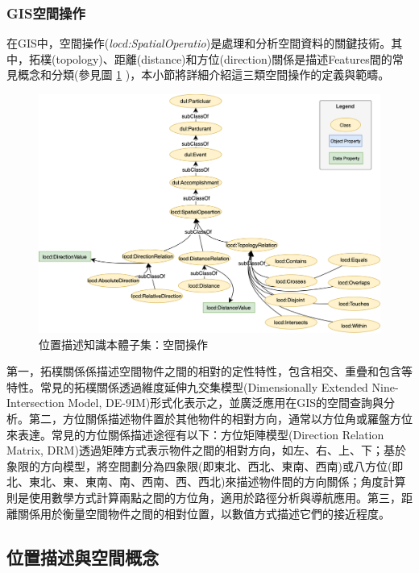 

\subsubsection{GIS空間操作}

在GIS中，空間操作(\textit{locd:SpatialOperatio})是處理和分析空間資料的關鍵技術。其中，拓樸(topology)、距離(distance)和方位(direction)關係是描述Features間的常見概念和分類(參見圖 \ref{fig:locd_spatialoperation} )，本小節將詳細介紹這三類空間操作的定義與範疇。

\begin{figure}[!htbp]
\centering
\includegraphics[width = \textwidth]{figures/LocD_spatialoperation.png}
\caption{位置描述知識本體子集：空間操作}
\label{fig:locd_spatialoperation}
\end{figure}

第一，拓樸關係係描述空間物件之間的相對的定性特性，包含相交、重疊和包含等特性。常見的拓樸關係透過維度延伸九交集模型(Dimensionally Extended Nine-Intersection Model, DE-9IM)形式化表示之，並廣泛應用在GIS的空間查詢與分析。第二，方位關係描述物件置於其他物件的相對方向，通常以方位角或羅盤方位來表達。常見的方位關係描述途徑有以下：方位矩陣模型(Direction Relation Matrix, DRM)透過矩陣方式表示物件之間的相對方向，如左、右、上、下\citep{RN183}；基於象限的方向模型，將空間劃分為四象限(即東北、西北、東南、西南)或八方位(即北、東北、東、東南、南、西南、西、西北)來描述物件間的方向關係；角度計算則是使用數學方式計算兩點之間的方位角，適用於路徑分析與導航應用。第三，距離關係用於衡量空間物件之間的相對位置，以數值方式描述它們的接近程度。

\subsection{位置描述與空間概念}

